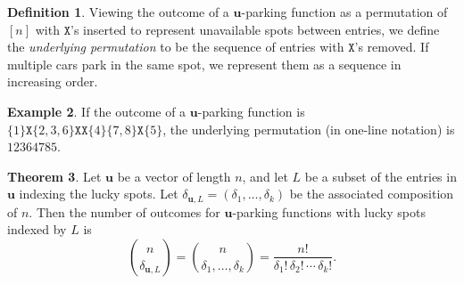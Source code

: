\documentclass[reqno]{amsart}
\newcommand{\X}{\texttt{X}}
\theoremstyle{definition}
\newtheorem{theorem}{Theorem}[section]
\newtheorem{example}[theorem]{Example}
\newtheorem{definition}[theorem]{Definition}
\theoremstyle{remark}
\newcommand{\bsy}{\boldsymbol}
\begin{document}
\begin{definition}
Viewing the outcome of a $\bsy u$-parking function as a permutation of $[n]$ with $\X$'s inserted to represent unavailable spots between entries, we define the \emph{underlying permutation} to be the sequence of entries with $\X$'s removed. If multiple cars park in the same spot, we represent them as a sequence in increasing order.
\end{definition}

\begin{example}
If the outcome of a $\bsy{u}$-parking function is $\{1\}\X\{2,3,6\}\X\X\{4\}\{7,8\}\X\{5\}$, the underlying permutation (in one-line notation) is $12364785$.
\end{example}
\begin{theorem}
    Let $\bsy u$ be a vector of length $n$, and let $L$ be a subset of the entries in $\bsy u$ indexing the lucky spots. 
    Let $\delta_{\bsy u, L} = (\delta_1,\ldots, \delta_k)$ be the associated composition of $n$.
Then the number of outcomes for $\bsy u$-parking functions with lucky spots indexed by $L$ is  \[\binom{n }{\delta_{\bsy u, L}} = \binom{n }{\delta_1,\ldots,\delta_k} = \frac{n!}{\delta_1!\, \delta_2 ! \,\cdots\, \delta_k!}.\]
\end{theorem}
\end{document}
